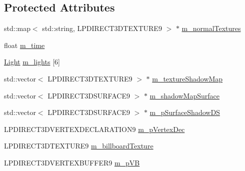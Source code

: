 \subsection*{Protected Attributes}
\begin{DoxyCompactItemize}
\item 
std::map$<$ std::string, LPDIRECT3DTEXTURE9 $>$ $\ast$ \hyperlink{class_master_shader_aad808d20c01b79a070560263d64541f5}{m\_\-normalTextures}
\item 
float \hyperlink{class_master_shader_ad7431a0297a89d1505463f4b634fc4ec}{m\_\-time}
\item 
\hyperlink{struct_light}{Light} \hyperlink{class_master_shader_abbcc71cc579b0d701276d373932bda52}{m\_\-lights} \mbox{[}6\mbox{]}
\item 
std::vector$<$ LPDIRECT3DTEXTURE9 $>$ $\ast$ \hyperlink{class_master_shader_a56acde939cd7a8d278c9ad23b9bc8673}{m\_\-textureShadowMap}
\item 
std::vector$<$ LPDIRECT3DSURFACE9 $>$ $\ast$ \hyperlink{class_master_shader_a7e37a6ac3d2d161583c6b567b1762510}{m\_\-shadowMapSurface}
\item 
std::vector$<$ LPDIRECT3DSURFACE9 $>$ $\ast$ \hyperlink{class_master_shader_a051e371aa066bcdf405b08f77acdcccf}{m\_\-pSurfaceShadowDS}
\item 
LPDIRECT3DVERTEXDECLARATION9 \hyperlink{class_master_shader_a379013e2729350855bd95337848260b9}{m\_\-pVertexDec}
\item 
LPDIRECT3DTEXTURE9 \hyperlink{class_master_shader_aa8db1d7a494db1b398700d8185f414f5}{m\_\-billboardTexture}
\item 
LPDIRECT3DVERTEXBUFFER9 \hyperlink{class_master_shader_a5082bcc19e3842984e9adc1e7c5f4932}{m\_\-pVB}
\end{DoxyCompactItemize}


